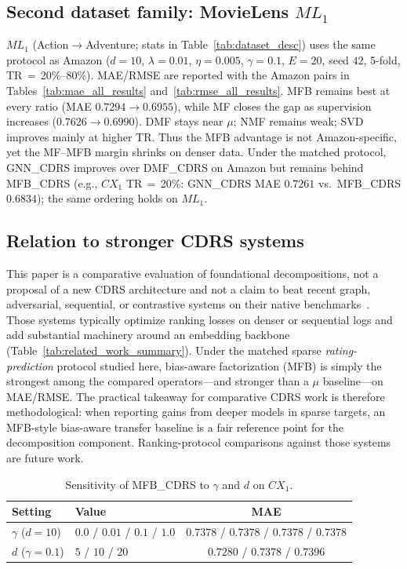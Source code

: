 \documentclass[pdflatex,sn-mathphys-num]{sn-jnl}%
\theoremstyle{thmstyleone}%
\theoremstyle{thmstyletwo}%
\theoremstyle{thmstylethree}%
\begin{document}
\subsection{Second dataset family: MovieLens $ML_1$}\label{sec:movielens}
$ML_1$ (Action$\to$Adventure; stats in Table~\ref{tab:dataset_desc}) uses the same protocol as Amazon ($d=10$, $\lambda=0.01$, $\eta=0.005$, $\gamma=0.1$, $E=20$, seed $42$, 5-fold, TR\,$=$\,20\%--80\%). MAE/RMSE are reported with the Amazon pairs in Tables~\ref{tab:mae_all_results} and~\ref{tab:rmse_all_results}. MFB remains best at every ratio (MAE $0.7294\to0.6955$), while MF closes the gap as supervision increases ($0.7626\to0.6990$). DMF stays near $\mu$; NMF remains weak; SVD improves mainly at higher TR. Thus the MFB advantage is not Amazon-specific, yet the MF--MFB margin shrinks on denser data. Under the matched protocol, GNN\_CDRS improves over DMF\_CDRS on Amazon but remains behind MFB\_CDRS (e.g., $CX_1$ TR\,$=$\,20\%: GNN\_CDRS MAE $0.7261$ vs.\ MFB\_CDRS $0.6834$); the same ordering holds on $ML_1$.

\subsection{Relation to stronger CDRS systems}
This paper is a comparative evaluation of foundational decompositions, not a proposal of a new CDRS architecture and not a claim to beat recent graph, adversarial, sequential, or contrastive systems on their native benchmarks~\cite{cao2022disencdr,meng2025heterogeneous,shu2024self,he2020lightgcn}. Those systems typically optimize ranking losses on denser or sequential logs and add substantial machinery around an embedding backbone (Table~\ref{tab:related_work_summary}). Under the matched sparse \emph{rating-prediction} protocol studied here, bias-aware factorization (MFB) is simply the strongest among the compared operators---and stronger than a $\mu$ baseline---on MAE/RMSE. The practical takeaway for comparative CDRS work is therefore methodological: when reporting gains from deeper models in sparse targets, an MFB-style bias-aware transfer baseline is a fair reference point for the decomposition component. Ranking-protocol comparisons against those systems are future work.

\begin{table}[!htbp]
\centering
\caption{Sensitivity of MFB\_CDRS to $\gamma$ and $d$ on $CX_1$.}
\label{tab:sensitivity}
\renewcommand{\arraystretch}{1.15}
\small
\begin{tabularx}{\textwidth}{>{\raggedright\arraybackslash}X >{\centering\arraybackslash}X c}
\toprule
\textbf{Setting} & \textbf{Value} & \textbf{MAE} \\
\midrule
$\gamma$ ($d=10$) & $0.0$ / $0.01$ / $0.1$ / $1.0$ & $0.7378$ / $0.7378$ / $0.7378$ / $0.7378$ \\
$d$ ($\gamma=0.1$) & $5$ / $10$ / $20$ & $0.7280$ / $0.7378$ / $0.7396$ \\
\bottomrule
\end{tabularx}
\end{table}
\end{document}
